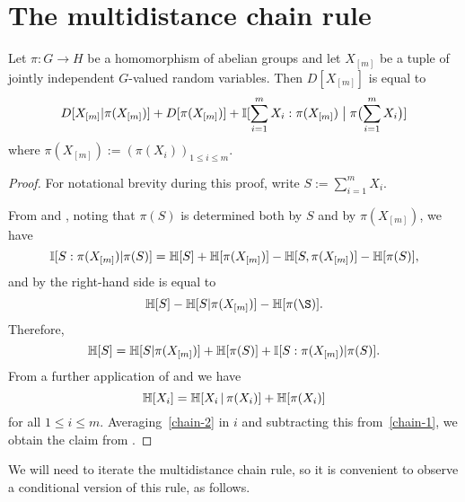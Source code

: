 \section{The multidistance chain rule}

\begin{lemma}\label{multidist-chain-rule}  Let $\pi \colon G \to H$ be a homomorphism of abelian groups and let $X_{[m]}$ be a tuple of jointly independent $G$-valued random variables.  Then $D[X_{[m]}]$ is equal to
  \begin{equation}
      D[ X_{[m]} | \pi(X_{[m]}) ]  +D[ \pi(X_{[m]}) ]  + \mathbb{I}[ \sum_{i=1}^m X_i  : \pi(X_{[m]}) \; \big| \; \pi\bigl(\sum_{i=1}^m X_i\bigr) ]
    \label{chain-eq}
  \end{equation}
  where $\pi(X_{[m]}) := (\pi(X_i))_{1 \leq i \leq m}$.
  \end{lemma}

  \begin{proof} For notational brevity during this proof, write $S := \sum_{i=1}^m X_i$.

    From  and , noting that $\pi(S)$ is determined both by $S$ and by $\pi(X_{[m]})$, we have
  \begin{equation*}
   \mathbb{I}[S:\pi(X_{[m]})|\pi(S)] = \mathbb{H}[S]+\mathbb{H}[\pi(X_{[m]})]-\mathbb{H}[S,\pi(X_{[m]})]-\mathbb{H}[\pi(S)],
  \end{equation*}
  and by  the right-hand side is equal to
  \begin{equation*}
  \bbH[S]-\bbH[S|\pi(X_{[m]})]-\bbH[\pi(\S)].
  \end{equation*}
  Therefore,
  \begin{equation}\label{chain-1}
  \mathbb{H}[S]=\mathbb{H}[S|\pi(X_{[m]})]+\mathbb{H}[\pi(S)]+\mathbb{I}[S:\pi(X_{[m]})|\pi(S)]. \end{equation}
  From a further application of  and  we have
  \begin{equation}\label{chain-2}
    \mathbb{H}[X_i] = \mathbb{H}[X_i \, | \, \pi(X_i)] + \mathbb{H}[\pi(X_i)]
  \end{equation}
  for all $1 \leq i \leq m$.  Averaging~\eqref{chain-2} in $i$ and subtracting this from~\eqref{chain-1}, we obtain the claim from .
  \end{proof}

  We will need to iterate the multidistance chain rule, so it is convenient to observe a conditional version of this rule, as follows.

